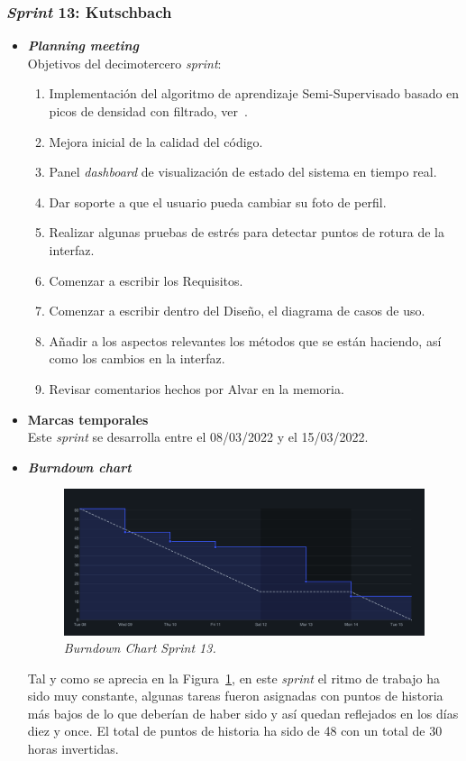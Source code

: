 \subsubsection{\textit{Sprint} 13: Kutschbach}
\begin{itemize}
\item \textbf{\textit{Planning meeting}}\\
Objetivos del decimotercero \textit{sprint}:
\begin{enumerate}
\item Implementación del algoritmo de aprendizaje Semi-Supervisado basado en picos de densidad con filtrado, ver~\cite{LI2019104895}.
\item Mejora inicial de la calidad del código.
\item Panel \textit{dashboard} de visualización de estado del sistema en tiempo real.
\item Dar soporte a que el usuario pueda cambiar su foto de perfil.
\item Realizar algunas pruebas de estrés para detectar puntos de rotura de la interfaz.
\item Comenzar a escribir los Requisitos.
\item Comenzar a escribir dentro del Diseño, el diagrama de casos de uso.
\item Añadir a los aspectos relevantes los métodos que se están haciendo, así como los cambios en la interfaz.
\item Revisar comentarios hechos por Alvar en la memoria.
\end{enumerate}

\item \textbf{Marcas temporales}\\
Este \textit{sprint} se desarrolla entre el 08/03/2022 y el 15/03/2022.

\item \textbf{\textit{Burndown chart}}\\
\begin{figure}
\begin{center}
\includegraphics[width=\textwidth]{../img/anexos/sprints/BD-Sprint13}
\caption{\textit{Burndown Chart Sprint 13.}}\label{fig:BD-Sprint13}
\end{center}
\end{figure}
Tal y como se aprecia en la Figura~\ref{fig:BD-Sprint13}, en este \textit{sprint} el ritmo de trabajo ha sido muy constante, algunas tareas fueron asignadas con puntos de historia más bajos de lo que deberían de haber sido y así quedan reflejados en los días diez y once. El total de puntos de historia ha sido de 48 con un total de 30 horas invertidas.


\end{itemize}
